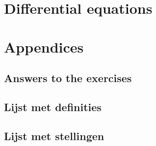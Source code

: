\documentclass[twoside,english]{book}
\theoremstyle{nonumberplain}
\theoremstyle{break}
\theoremstyle{break}
\theoremstyle{nonumberplain}
\begin{document}
\part{Differential equations}
\label{deel4}




\fi


\stopthumb
\epigraphhead[500]{\hspace*{-13cm}} 
\part{Appendices}

\appendix



\ifmathematica

\fi

\ifpython

\fi


\chapter{Answers to the exercises}
\shipoutAnswer


\shipoutAnswer




%
%
%
%



\chapter{Lijst met definities}

\chapter{Lijst met stellingen}

\backmatter
\printindex
\end{document}
